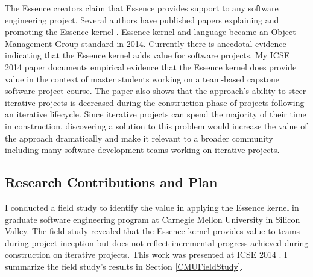 \documentclass[preprint,12pt,3p]{elsarticle}
\begin{document}
The Essence creators claim that Essence provides support to any software engineering project. Several authors have published papers explaining and promoting the Essence kernel \cite{CallToAction, JacobsonQueue, OMGStandard,  AgileSEMAT, EssenceBook, JacobsonMajorLeaugue, JacobsonNewSoftwareEngineering}. Essence kernel and language became an Object Management Group standard in 2014. Currently there is anecdotal evidence indicating that the Essence kernel adds value for software projects. My ICSE 2014 paper \cite{ICSE2014} documents empirical evidence that the Essence kernel does provide value in the context of master students working on a team-based capstone software project course. 
The paper also shows that the approach's ability to steer iterative projects is decreased during the construction phase of projects following an iterative lifecycle. Since iterative projects can spend the majority of their time in construction, discovering a solution to this problem would increase the value of the approach dramatically and make it relevant to a broader community including many software development teams working on iterative projects.

\subsection{Research Contributions and Plan}

I conducted a field study to identify the value in applying the Essence kernel in graduate software engineering program at Carnegie Mellon University in Silicon Valley. The field study revealed that the Essence kernel provides value to teams during project inception but does not reflect incremental progress achieved during construction on iterative projects. This work was presented at ICSE 2014 \cite{ICSE2014}. I summarize the field study's results in Section \ref{CMUFieldStudy}.
\end{document}
